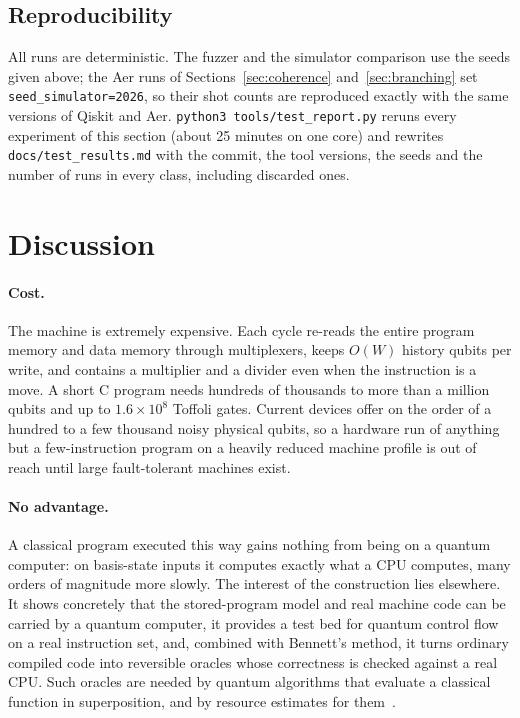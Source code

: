 \documentclass[11pt]{article}
\begin{document}
\subsection{Reproducibility}

All runs are deterministic. The fuzzer and the simulator comparison use the seeds given above;
the Aer runs of Sections~\ref{sec:coherence} and~\ref{sec:branching} set
\texttt{seed\_simulator=2026}, so their shot counts are reproduced exactly with the same versions of
Qiskit and Aer. \texttt{python3 tools/test\_report.py} reruns
every experiment of this section (about 25 minutes on one core) and rewrites
\texttt{docs/test\_results.md} with the commit, the tool versions, the seeds and the number of runs in
every class, including discarded ones.

\section{Discussion}
\label{sec:discussion}

\paragraph{Cost.} The machine is extremely expensive. Each cycle re-reads the entire program
memory and data memory through multiplexers, keeps $O(W)$ history qubits per write, and
contains a multiplier and a divider even when the instruction is a move. A short C program
needs hundreds of thousands to more than a million qubits and up to $1.6\times10^{8}$ Toffoli
gates. Current devices offer on the order of a hundred to a few thousand noisy physical
qubits, so a hardware run of anything but a few-instruction program on a heavily reduced
machine profile is out of reach until large fault-tolerant machines exist.

\paragraph{No advantage.} A classical program executed this way gains nothing from being on a
quantum computer: on basis-state inputs it computes exactly what a CPU computes, many orders
of magnitude more slowly. The interest of the construction lies elsewhere. It shows concretely
that the stored-program model and real machine code can be carried by a quantum computer, it
provides a test bed for quantum control flow on a real instruction set, and, combined with
Bennett's method, it turns ordinary compiled code into reversible oracles whose correctness is
checked against a real CPU. Such oracles are needed by quantum algorithms that evaluate a
classical function in superposition, and by resource estimates for them~\cite{grassl2016aes,amy2016sha}.
\end{document}
